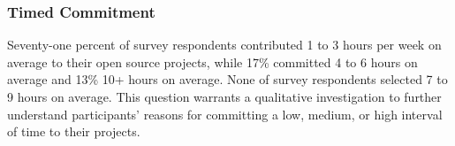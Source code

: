 \subsubsection{\bf Timed Commitment} Seventy-one percent of survey respondents contributed 1 to 3 hours per week on average to their open source projects, while 17\%
committed 4 to 6 hours on average and 13\% 10+ hours on average. None of survey respondents selected 7 to 9 hours on average. This question warrants 
a qualitative investigation to further understand participants' reasons for committing a low, medium, or high interval of 
time to their projects. 